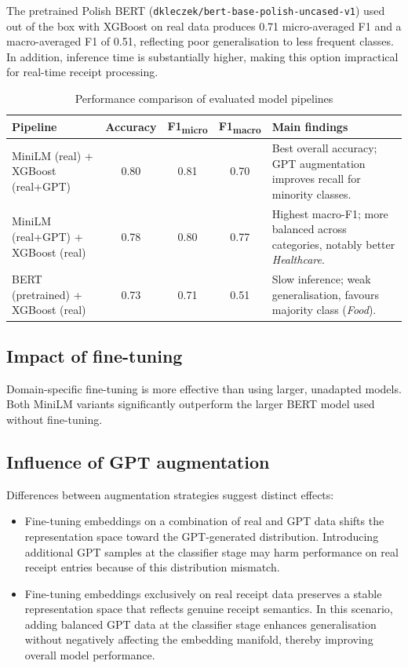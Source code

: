 \documentclass{SGGW-thesis-EN}
\begin{document}
The pretrained Polish BERT (\texttt{dkleczek/bert-base-polish-uncased-v1}) used out of the box with XGBoost on real
data produces 0.71 micro-averaged F1 and a macro-averaged F1 of 0.51, reflecting poor
generalisation to less frequent classes. In addition, inference time is substantially higher, making this option
impractical for real-time receipt processing.

\begin{table}
  \centering
  \caption{Performance comparison of evaluated model pipelines}
  \label{tab:results_comparison}
  \begin{tabularx}{\textwidth}{p{4cm}cccX}
    \toprule
    \textbf{Pipeline} & \textbf{Accuracy} & \textbf{F1\textsubscript{micro}} & \textbf{F1\textsubscript{macro}} & \textbf{Main findings} \\
    \midrule
    MiniLM (real) + XGBoost (real+GPT) & 0.80 & 0.81 & 0.70 &
      Best overall accuracy; GPT augmentation improves recall for minority classes. \\
    MiniLM (real+GPT) + XGBoost (real) & 0.78 & 0.80 & 0.77 &
      Highest macro-F1; more balanced across categories, notably better \emph{Healthcare}. \\
    BERT (pretrained) + XGBoost (real) & 0.73 & 0.71 & 0.51 &
      Slow inference; weak generalisation, favours majority class (\emph{Food}). \\
    \bottomrule
  \end{tabularx}
\end{table}


\subsection{Impact of fine-tuning}
Domain-specific fine-tuning is more effective than using larger, unadapted models. Both MiniLM variants
significantly outperform the larger BERT model used without fine-tuning.

\subsection{Influence of GPT augmentation}
Differences between augmentation strategies suggest distinct effects:
\begin{itemize}
  \item Fine-tuning embeddings on a combination of real and GPT data shifts the representation space toward
        the GPT-generated distribution. Introducing additional GPT samples at the classifier stage may harm
        performance on real receipt entries because of this distribution mismatch.
  \item Fine-tuning embeddings exclusively on real receipt data preserves a stable representation space that
        reflects genuine receipt semantics. In this scenario, adding balanced GPT data at the classifier stage
        enhances generalisation without negatively affecting the embedding manifold, thereby improving overall
        model performance.
\end{itemize}
\end{document}
